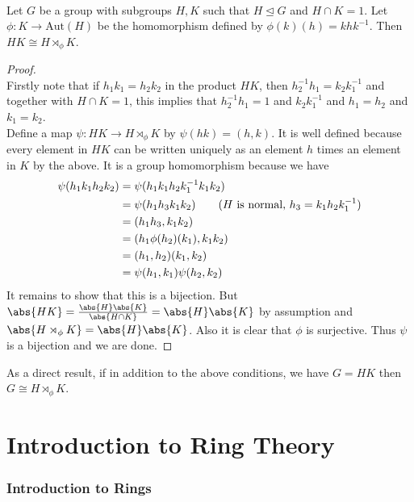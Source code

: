 \documentclass[a4paper]{article}
\begin{document}
\begin{prp}{}{}\\
Let $G$ be a group with subgroups $H,K$ such that $H\trianglelefteq G$ and $H\cap K=1$. Let $\phi:K\to\text{Aut}(H)$ be the homomorphism defined by $\phi(k)(h)=khk^{-1}$. Then $HK\cong H\rtimes_\phi K$. 
\begin{proof}\\
Firstly note that if $h_1k_1=h_2k_2$ in the product $HK$, then $h_2^{-1}h_1=k_2k_1^{-1}$ and together with $H\cap K=1$, this implies that $h_2^{-1}h_1=1$ and $k_2k_1^{-1}$ and $h_1=h_2$ and $k_1=k_2$. \\

Define a map $\psi:HK\to H\rtimes_\phi K$ by $\psi(hk)=(h,k)$. It is well defined because every element in $HK$ can be written uniquely as an element $h$ times an element in $K$ by the above. It is a group homomorphism because we have 
\begin{align*}
\psi(h_1k_1h_2k_2)&=\psi(h_1k_1h_2k_1^{-1}k_1k_2)\\
&=\psi(h_1h_3k_1k_2)\tag{$H$ is normal, $h_3=k_1h_2k_1^{-1}$}\\
&=(h_1h_3,k_1k_2)\\
&=(h_1\phi(h_2)(k_1),k_1k_2)\\
&=(h_1,h_2)(k_1,k_2)\\
&=\psi(h_1,k_1)\psi(h_2,k_2)
\end{align*}
It remains to show that this is a bijection. But $\abs{HK}=\frac{\abs{H}\abs{K}}{\abs{H\cap K}}=\abs{H}\abs{K}$ by assumption and $\abs{H\rtimes_\phi K}=\abs{H}\abs{K}$. Also it is clear that $\phi$ is surjective. Thus $\psi$ is a bijection and we are done. 
\end{proof}
\end{prp}

As a direct result, if in addition to the above conditions, we have $G=HK$ then $G\cong H\rtimes_\phi K$. 

\pagebreak

\part{Introduction to Ring Theory}

\pagebreak
\section{Introduction to Rings}
\end{document}
